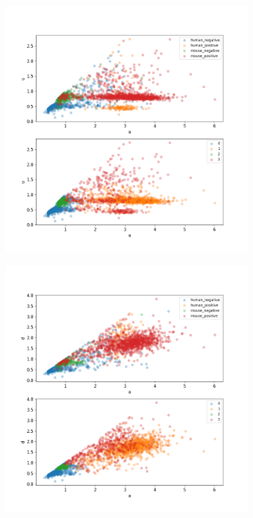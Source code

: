 \begin{figure}
	\centering
	\begin{subfigure}{0.3\textwidth}
		\includegraphics[width=\textwidth]{fig/seperate_a_u}
	\end{subfigure}
	\hfill
	\begin{subfigure}{0.3\textwidth}
		\includegraphics[width=\textwidth]{fig/seperate_a_d}

\end{subfigure}
\end{figure}
